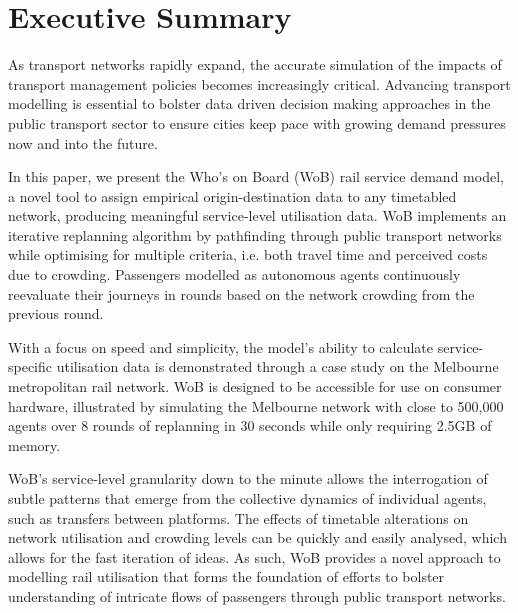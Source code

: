 \chapter{Executive Summary}
\vspace{-2pt}
As transport networks rapidly expand, the accurate simulation of the impacts of transport management policies becomes increasingly critical. Advancing transport modelling is essential to bolster data driven decision making approaches in the public transport sector to ensure cities keep pace with growing demand pressures now and into the future. 

In this paper, we present the Who's on Board (WoB) rail service demand model, a novel tool to assign empirical origin-destination data to any timetabled network, producing meaningful service-level utilisation data. WoB implements an iterative replanning algorithm by pathfinding through public transport networks while optimising for multiple criteria, i.e. both travel time and perceived costs due to crowding. Passengers modelled as autonomous agents continuously reevaluate their journeys in rounds based on the network crowding from the previous round.

With a focus on speed and simplicity, the model's ability to calculate service-specific utilisation data is demonstrated through a case study on the Melbourne metropolitan rail network. WoB is designed to be accessible for use on consumer hardware, illustrated by simulating the Melbourne network with close to 500,000 agents over 8 rounds of replanning in 30 seconds while only requiring 2.5GB of memory.

WoB's service-level granularity down to the minute allows the interrogation of subtle patterns that emerge from the collective dynamics of individual agents, such as transfers between platforms. The effects of timetable alterations on network utilisation and crowding levels can be quickly and easily analysed, which allows for the fast iteration of ideas. As such, WoB provides a novel approach to modelling rail utilisation that forms the foundation of efforts to bolster understanding of intricate flows of passengers through public transport networks. 
